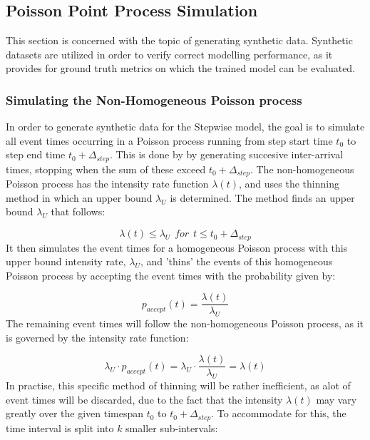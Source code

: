 \subsection{Poisson Point Process Simulation}
\label{sec:Method:PoissonSimulation}
This section is concerned with the topic of generating synthetic data.
Synthetic datasets are utilized in order to verify correct modelling performance, as it provides for ground truth metrics on which the trained model can be evaluated.


\subsubsection{Simulating the Non-Homogeneous Poisson process\cite{Ross2013GeneratingVariables}}
\label{sec:Method:PoissonSimulation:NonHomogeneous}
In order to generate synthetic data for the Stepwise model, the goal is to simulate all event times occurring in a Poisson process running from step start time $t_0$ to step end time $t_0 + \Delta_{step}$.
This is done by by generating succesive inter-arrival times, stopping when the sum of these exceed $t_0 + \Delta_{step}$.
The non-homogeneous Poisson process has the intensity rate function $\lambda(t)$, and uses the thinning method in which an upper bound $\lambda_U$ is determined.
The method finds an upper bound $\lambda_U$ that follows:

\begin{equation}
    \lambda(t) \leq \lambda_U \hspace{5pt} for \hspace{5pt} t \leq t_0 + \Delta_{step}
\end{equation}
It then simulates the event times for a homogeneous Poisson process with this upper bound intensity rate, $\lambda_U$, and 'thins' the events of this homogeneous Poisson process by accepting the event times with the probability given by:

\begin{equation}
    p_{accept}(t) = \frac{\lambda(t)}{\lambda_U}
\end{equation}
The remaining event times will follow the non-homogeneous Poisson process, as it is governed by the intensity rate function:

\begin{equation}
    \lambda_U \cdot p_{accept}(t) = \lambda_U \cdot \frac{\lambda(t)}{\lambda_U} = \lambda(t)
\end{equation}
In practise, this specific method of thinning will be rather inefficient, as alot of event times will be discarded, due to the fact that the intensity $\lambda(t)$ may vary greatly over the given timespan $t_0$ to $t_0 + \Delta_{step}$.
To accommodate for this, the time interval is split into $k$ smaller sub-intervals:

